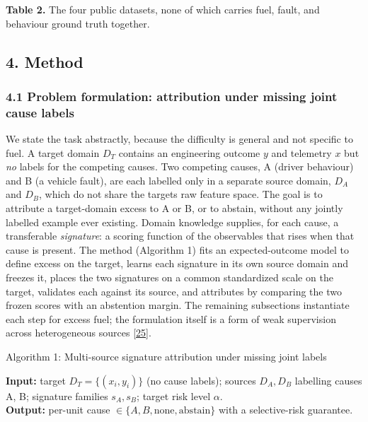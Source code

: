 \textbf{Table 2.} The four public datasets, none of which carries fuel,
fault, and behaviour ground truth together.

\subsection{4. Method}\label{method}

\subsubsection{4.1 Problem formulation: attribution under missing joint
cause
labels}\label{problem-formulation-attribution-under-missing-joint-cause-labels}

We state the task abstractly, because the difficulty is general and not
specific to fuel. A target domain \(D_T\) contains an engineering
outcome \(y\) and telemetry \(x\) but \emph{no} labels for the competing
causes. Two competing causes, A (driver behaviour) and B (a vehicle
fault), are each labelled only in a separate source domain, \(D_A\) and
\(D_B\), which do not share the target\textquotesingle s raw feature
space. The goal is to attribute a target-domain excess to A or B, or to
abstain, without any jointly labelled example ever existing. Domain
knowledge supplies, for each cause, a transferable \emph{signature}: a
scoring function of the observables that rises when that cause is
present. The method (Algorithm 1) fits an expected-outcome model to
define excess on the target, learns each signature in its own source
domain and freezes it, places the two signatures on a common
standardized scale on the target, validates each against its source, and
attributes by comparing the two frozen scores with an abstention margin.
The remaining subsections instantiate each step for excess fuel; the
formulation itself is a form of weak supervision across heterogeneous
sources {[}\hyperref[r25]{25}{]}.

Algorithm 1: Multi-source signature attribution under missing joint
labels

\textbf{Input:} target \(D_T=\{(x_i,y_i)\}\) (no cause labels); sources
\(D_A,D_B\) labelling causes A, B; signature families \(s_A,s_B\);
target risk level \(\alpha\).\\
\textbf{Output:} per-unit cause
\(\in\{A,B,\text{none},\text{abstain}\}\) with a selective-risk
guarantee.

